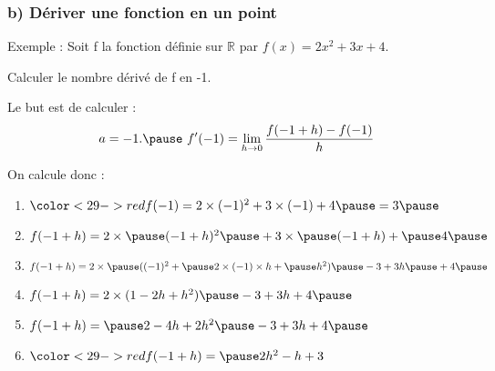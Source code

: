 \documentclass[t]{beamer}
\begin{document}
	\begin{frame}[label=pagebanale]
		\frametitle{b) Dériver une fonction en un point}
		\pause

		\begin{exampleblock}{Exemple :}
			\pause
			Soit f la fonction définie sur $\mathbb{R}$ par $f(x) = 2x^2 + 3x + 4.$

			\pause
			Calculer le nombre dérivé de f en -1.
			\pause
		\end{exampleblock}

		\begin{block}{Le but est de calculer :}
			\pause
			\[  a = -1. \pause \
			f'(-1) =\lim\limits_{h \rightarrow 0}\frac{f(-1+h) - f(-1)}{h}\]
			\pause
		\end{block}

		\begin{block}{On calcule donc :}
			\pause
			\begin{enumerate}[]
				\item \(\color<29->{red}{f(-1) = 2 \times (-1)^2 + 3 \times (-1) + 4 \pause = 3} \pause \)
				\item \(f(-1+ h) = 2 \times \pause (-1+h)^2 \pause + 3 \times \pause (-1+h) + \pause 4 \pause \)
				\item \(f(-1+ h) = 2 \times \pause ((-1)^2 + \pause 2 \times (-1) \times h + \pause  h^2) \pause - 3 + 3h \pause + 4 \pause \)
				\item \( f(-1+ h) = 2 \times (1 - 2h + h^2) \pause -3 +3h + 4 \pause \)
				\item \(f(-1+h) = \pause 2 - 4h + 2h^2 \pause -3 + 3h + 4 \pause \)
				\item \(\color<29->{red}{f(-1+ h) = \pause 2h^2 - h + 3}\)
			\end{enumerate}
		\end{block}
	\end{frame}
\end{document}
